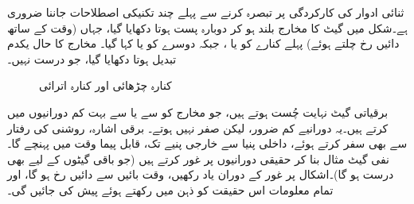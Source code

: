 ثنائی ادوار کی کارکردگی پر تبصرہ کرنے سے پہلے چند تکنیکی اصطلاحات جاننا ضروری ہے۔شکل  میں گیٹ کا مخارج بلند ہو کر دوبارہ پست ہوتا دکھایا گیا، جہاں (وقت  کے ساتھ دائیں رخ چلتے ہوئے) پہلے کنارے کو  یا  ، جبکہ دوسرے کو  یا  کہا گیا۔ مخارج کا حال یکدم تبدیل ہوتا دکھایا گیا، جو درست نہیں۔
\begin{figure}
\centering
{}
\caption{کنارہ چڑھائی اور کنارہ اترائی}
\label{شکل_ترتیبی_کنارے}
\end{figure}

برقیاتی گیٹ نہایت چُست ہوتے ہیں، جو مخارج کو  سے  یا  سے  بہت کم دورانیوں میں کرتے ہیں۔یہ دورانیے کم ضرور، لیکن صفر نہیں ہوتے۔ برقی اشارہ، روشنی کی رفتار سے بھی سفر کرتے ہوئے، داخلی پنیا سے خارجی پنیے تک، قابل پیما وقت میں پہنچے گا۔ نفی گیٹ مثال بنا کر حقیقی دورانیوں پر غور کرتے ہیں (جو باقی گیٹوں کے لیے بھی درست ہو گا)۔اشکال پر غور کے دوران یاد رکھیں، وقت بائیں سے دائیں رخ ہو گا، اور تمام معلومات اس حقیقت کو ذہن میں رکھتے ہوئے پیش کی جائیں گی۔

